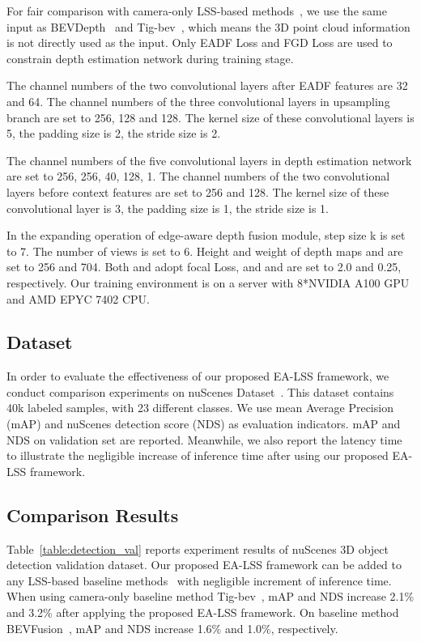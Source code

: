 \documentclass[letterpaper]{article} \usepackage[submission]{aaai24}  \usepackage{times}  \usepackage{helvet}  \usepackage{courier}  \usepackage[hyphens]{url}  \usepackage{graphicx} \urlstyle{rm} \def\UrlFont{\rm}  \usepackage{natbib}  \usepackage{caption} \frenchspacing  \setlength{\pdfpagewidth}{8.5in} \setlength{\pdfpageheight}{11in} \usepackage{algorithm}
\begin{document}
For fair comparison with camera-only LSS-based methods~\cite{li2022bevdepth,huang2022tigbev}, we use the same input as BEVDepth~\cite{li2022bevdepth} and Tig-bev~\cite{huang2022tigbev}, which means the 3D point cloud information is not directly used as the input. Only EADF Loss and FGD Loss are used to constrain depth estimation network during training stage.



The channel numbers of the two convolutional layers after EADF features are 32 and 64. The channel numbers of the three convolutional layers in upsampling branch are set to 256, 128 and 128. The kernel size of these convolutional layers is 5, the padding size is 2, the stride size is 2.

The channel numbers of the five convolutional layers in depth estimation network are set to 256, 256, 40, 128, 1. The channel numbers of the two convolutional layers before context features are set to 256 and 128. The kernel size of these convolutional layer is 3, the padding size is 1, the stride size is 1.

In the expanding operation of edge-aware depth fusion module, step size k is set to 7. The number of views  is set to 6. Height and weight of depth maps  and  are set to 256 and 704.
Both  and  adopt focal Loss, and  and  are set to 2.0 and 0.25, respectively. Our training environment is on a server with 8*NVIDIA A100 GPU and AMD EPYC 7402 CPU.



\subsection{Dataset}
In order to evaluate the effectiveness of our proposed EA-LSS framework, we conduct comparison experiments on nuScenes Dataset~\cite{caesar2020nuScenes}. This dataset contains 40k labeled samples, with 23 different classes. We use mean Average Precision (mAP) and nuScenes detection score (NDS) as evaluation indicators. 
mAP and NDS on validation set are reported. Meanwhile, we also report the latency time to illustrate the negligible increase of inference time after using our proposed EA-LSS framework. 

\subsection{Comparison Results}


Table~\ref{table:detection_val} reports experiment results of nuScenes 3D object detection validation dataset. Our proposed EA-LSS framework can be added to any LSS-based baseline methods~\cite{li2022bevdepth,liu2022bevfusion, liang2022bevfusion,huang2022tigbev} with negligible increment of inference time. When using camera-only baseline method Tig-bev~\cite{huang2022tigbev}, mAP and NDS increase 2.1\% and 3.2\% after applying the proposed EA-LSS framework. 
On baseline method BEVFusion~\cite{liang2022bevfusion}, mAP and NDS increase 1.6\% and 1.0\%, respectively. 
\end{document}
